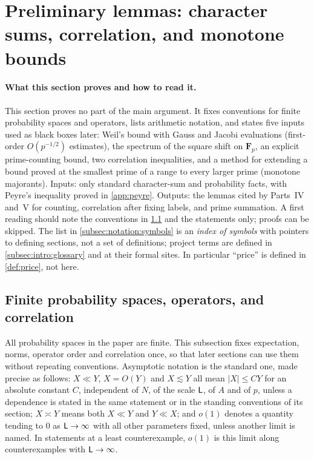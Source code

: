 \section{Preliminary lemmas: character sums, correlation, and monotone bounds}\label{sec:notation}

\paragraph{What this section proves and how to read it.}
This section proves no part of the main argument. It fixes
conventions for finite probability spaces and operators, lists
arithmetic notation, and states five inputs used as black boxes
later: Weil's bound with Gauss and Jacobi evaluations (first-order
$O(p^{-1/2})$ estimates), the spectrum of the square shift on
$\mathbf F_p$, an explicit prime-counting bound, two correlation
inequalities, and a method for extending a bound proved at the
smallest prime of a range to every larger prime (monotone
majorants). Inputs: only standard character-sum and probability
facts, with Peyre's inequality proved in \cref{app:peyre}. Outputs:
the lemmas cited by Parts~IV and~V for counting, correlation after
fixing labels, and prime summation. A first reading should note the
conventions in \cref{subsec:notation:conventions} and the statements
only; proofs can be skipped. The list in
\cref{subsec:notation:symbols} is an \emph{index of symbols} with
pointers to defining sections, not a set of definitions; project
terms are defined in \cref{subsec:intro:glossary} and at their formal
sites. In particular ``price'' is defined in \cref{def:price}, not
here.

\subsection{Finite probability spaces, operators, and correlation}\label{subsec:notation:conventions}

All probability spaces in the paper are finite. This subsection
fixes expectation, norms, operator order and correlation once, so
that later sections can use them without repeating conventions.
Asymptotic notation is the standard one, made precise as follows:
$X\ll Y$, $X=O(Y)$ and $X\lesssim Y$ all mean $|X|\le CY$ for an
absolute constant $C$, independent of $N$, of the scale $\mathsf L$, of
$A$ and of $p$, unless a dependence is stated in the same
statement or in the standing conventions of its section; $X\asymp
Y$ means both $X\ll Y$ and $Y\ll X$; and $o(1)$ denotes a quantity
tending to $0$ as $\mathsf L\to\infty$ with all other parameters fixed,
unless another limit is named. In statements at a least
counterexample, $o(1)$ is this limit along counterexamples with
$\mathsf L\to\infty$.

